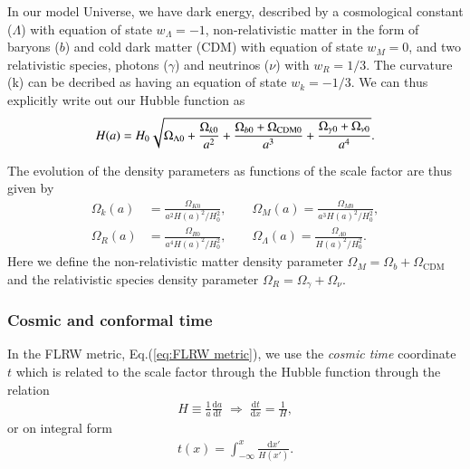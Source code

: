 \documentclass[twocolumn]{aa}
\renewcommand{\d}{\text{d}}
\newcommand{\dd}[2]{\frac{\d #1}{\d #2}}
\begin{document}
In our model Universe, we have dark energy, described by a cosmological constant ($\Lambda$) with equation of state $w_\Lambda=-1$, non-relativistic matter in the form of baryons ($b$) and cold dark matter (CDM) with equation of state $w_M = 0$, and two relativistic species, photons ($\gamma$) and neutrinos ($\nu$) with $w_R = 1/3$. The curvature (k) can be decribed as having an equation of state $w_k = -1/3$. We can thus explicitly write out our Hubble function as
\begin{equation}
      H(a) = H_0 \sqrt{\Omega_{\Lambda 0} + \frac{\Omega_{k 0}}{a^2} + \frac{\Omega_{b0} + \Omega_{\rm CDM 0}}{a^3} + \frac{\Omega_{\gamma 0} +\Omega_{\nu 0}}{a^4}}.\label{eq:Hubble a}
\end{equation}

The evolution of the density parameters as functions of the scale factor are thus given by
\begin{align}
\Omega_{k}(a) &= \frac{\Omega_{K0}}{a^2H(a)^2/H_0^2},\quad\quad\Omega_{M}(a) = \frac{\Omega_{M0}}{a^3H(a)^2/H_0^2},\nonumber \\
\Omega_R(a) &= \frac{\Omega_{R 0}}{a^4H(a)^2/H_0^2}, \quad\quad\Omega_{\Lambda}(a) = \frac{\Omega_{\Lambda 0}}{H(a)^2/H_0^2}.\label{eq:density parameter evolutions}
\end{align}
Here we define the non-relativistic matter density parameter $\Omega_M = \Omega_b + \Omega_\text{CDM}$ and the relativistic species density parameter $\Omega_R = \Omega_\gamma + \Omega_\nu$.


\subsubsection{Cosmic and conformal time}

In the FLRW metric, Eq.(\ref{eq:FLRW metric}), we use the \textit{cosmic time} coordinate $t$ which is related to the scale factor through the Hubble function through the relation
\begin{align*}
      H \equiv \frac{1}{a}\dd{a}{t}\;\Rightarrow \; \dd{t}{x} =\frac{1}{H}, 
\end{align*}
or on integral form 
\begin{align}
      t(x) = \int_{-\infty}^x \frac{\d x'}{H(x')} .\label{eq:t(x)}
\end{align}
\end{document}
